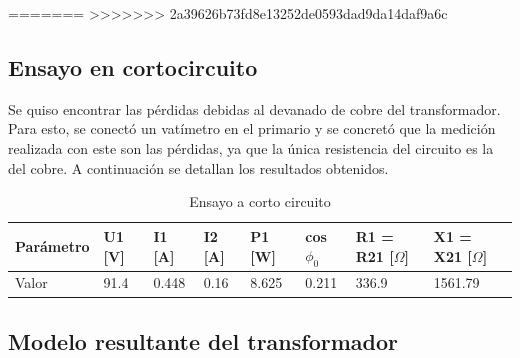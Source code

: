 \documentclass[a4paper]{article}
\begin{document}
=======
>>>>>>> 2a39626b73fd8e13252de0593dad9da14daf9a6c
\subsection{Ensayo en cortocircuito}
Se quiso encontrar las pérdidas debidas al devanado de cobre del transformador. Para esto, se conectó un vatímetro en el primario y se concretó que la medición realizada con este son las pérdidas, ya que la única resistencia del circuito es la del cobre. A continuación se detallan los resultados obtenidos.
\begin{table}[H]
\centering
\begin{tabular}{|l|l|l|l|l|l|l|l|}
\hline
Parámetro & U1 [V] & I1 [A] & I2 [A] & P1 [W] & cos $\phi_0$  & R1 = R21 [$\Omega$] & X1 = X21 [$\Omega$] \\ \hline
Valor     & 91.4     & 0.448    & 0.16     & 8.625    & 0.211            & 336.9               & 1561.79             \\ \hline
\end{tabular}
\caption {Ensayo a corto circuito}
\centering
\end{table}
\subsection{Modelo resultante del transformador}
\end{document}
